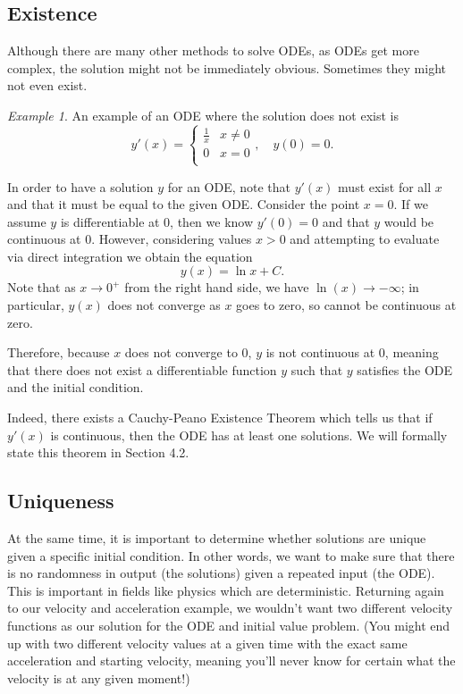 \documentclass{article}
\theoremstyle{remark}
\newtheorem{example}{Example}
\begin{document}
\subsection{Existence}
Although there are many other methods to solve ODEs, as ODEs get more complex, the solution might not be immediately obvious. Sometimes they might not even exist. 

\begin{example}
An example of an ODE where the solution does not exist is 
$$ y'(x) = \begin{cases} 
      \frac{1}{x} & x \neq 0 \\
      0 & x= 0 \\
   \end{cases} , \quad y(0) = 0.$$

In order to have a solution $y$ for an ODE, note that $y'(x)$ must exist for all $x$ and that it must be equal to the given ODE. Consider the point $x = 0$. If we assume $y$ is differentiable at 0, then we know  $y'(0) = 0$ and that $y$ would be continuous at 0. However, considering values $x > 0$ and attempting to evaluate via direct integration 
we obtain the equation $$y(x) = \ln x + C.$$ Note that as $x \to 0^+$ from the right hand side, we have $\ln(x) \to -\infty$; in particular, $y(x)$ does not converge as $x$ goes to zero, so cannot be continuous at zero.

Therefore, because $x$ does not converge to 0, $y$ is not continuous at 0, meaning that there does not exist a differentiable function $y$ such that $y$ satisfies the ODE and the initial condition. 

Indeed, there exists a Cauchy-Peano Existence Theorem which tells us that if  $y'(x)$ is  continuous, then the ODE has at least one solutions. We will formally state this theorem in Section 4.2.
\end{example}

\subsection{Uniqueness}
At the same time, it is important to determine whether solutions are unique given a specific initial condition. In other words, we want to make sure that there is no randomness in output (the solutions) given a repeated input (the ODE). This is important in fields like physics which are deterministic. Returning again to our velocity and acceleration example, we wouldn't want two different velocity functions as our solution for the ODE and initial value problem. (You might end up with two different velocity values at a given time with the exact same acceleration and starting velocity, meaning you'll never know for certain what the  velocity is at any given moment!) \\
\end{document}

